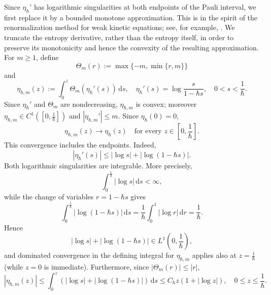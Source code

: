 \documentclass[10pt,reqno]{amsart}
\numberwithin{equation}{section}
\theoremstyle{definition}
\newcommand{\ds}{\mathrm{d}s}
\newcommand{\dr}{\mathrm{d}r}
\newcommand{\bq}{\begin{equation}}
\newcommand{\eq}{\end{equation}}
\newcommand{\lt}{\left}
\newcommand{\rt}{\right}
\begin{document}
Since $\eta_\hbar'$ has logarithmic singularities at both endpoints of the Pauli interval, we first replace it by a bounded monotone approximation.  This is in the spirit of the renormalization method for weak kinetic equations; see, for example, \cite{DL89}. We truncate the entropy derivative, rather than the entropy itself, in order to preserve its monotonicity and hence the convexity of the resulting approximation. For $m\geq1$, define
\[
 \Theta_m(r):=\max\{-m,\min\{r,m\}\}
\]
and
\[
 \eta_{\hbar,m}(z)  :=\int_0^z\Theta_m \lt(\eta_\hbar'(s)\rt)\,\ds,  \quad  \eta_\hbar'(s)=\log\frac{s}{1-\hbar s},  \quad 0<s<\frac1\hbar .
\]
Since $\eta_\hbar'$ and $\Theta_m$ are nondecreasing, $\eta_{\hbar,m}$ is convex; moreover $\eta_{\hbar,m}\in C^1([0,\frac1\hbar ])$ and $|\eta_{\hbar,m}'|\leq m$.  Since $\eta_\hbar(0)=0$,
\[
 \eta_{\hbar,m}(z)\to\eta_\hbar(z)  \quad\text{for every }z\in[0,\frac1\hbar ].
\]
This convergence includes the endpoints.  Indeed,
\[
 |\eta_\hbar'(s)|  \le |\log s|+|\log(1-\hbar s)|.
\]
Both logarithmic singularities are integrable.  More precisely,
\[
 \int_0^{\frac1\hbar }|\log s|\,\ds<\infty,
\]
while the change of variables $r=1-\hbar s$ gives
\[
 \int_0^{\frac1\hbar }|\log(1-\hbar s)|\,\ds  =  \frac1\hbar\int_0^1|\log r|\,\dr  =  \frac1\hbar.
\]
Hence
\[
 |\log s|+|\log(1-\hbar s)|  \in L^1(0,\frac1\hbar ),
\]
and dominated convergence in the defining integral for $\eta_{\hbar,m}$ applies also at $z=\frac1\hbar $ (while $z=0$ is immediate). Furthermore, since $|\Theta_m(r)|\leq|r|$,
\bq \label{eq:entr-tru-dom}
 |\eta_{\hbar,m}(z)| \leq\int_0^z\lt(|\log s|+|\log(1-\hbar s)|\rt)\,\ds \leq C_\hbar z(1+|\log z|),  \quad 0\leq z\leq\frac1\hbar .
\eq
\end{document}

